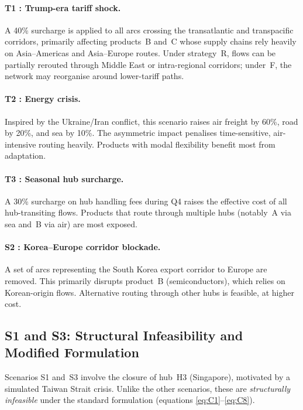 \paragraph{T1 : Trump-era tariff shock.}
A 40\% surcharge is applied to all arcs crossing the transatlantic and
transpacific corridors, primarily affecting products~B and~C whose supply
chains rely heavily on Asia--Americas and Asia--Europe routes.
Under strategy~R, flows can be partially rerouted through Middle East or
intra-regional corridors; under~F, the network may reorganise around
lower-tariff paths.

\paragraph{T2 : Energy crisis.}
Inspired by the Ukraine/Iran conflict, this scenario raises air freight by
60\%, road by 20\%, and sea by 10\%. The asymmetric impact penalises
time-sensitive, air-intensive routing heavily. Products with modal
flexibility benefit most from adaptation.

\paragraph{T3 : Seasonal hub surcharge.}
A 30\% surcharge on hub handling fees during Q4 raises the effective cost
of all hub-transiting flows. Products that route through multiple hubs
(notably~A via sea and~B via air) are most exposed.

\paragraph{S2 : Korea--Europe corridor blockade.}
A set of arcs representing the South Korea export corridor to Europe are
removed. This primarily disrupts product~B (semiconductors), which relies
on Korean-origin flows. Alternative routing through other hubs is feasible,
at higher cost.

\subsection{S1 and S3: Structural Infeasibility and Modified Formulation}
\label{sec:s1s3}

Scenarios S1 and~S3 involve the closure of hub~H3 (Singapore), motivated
by a simulated Taiwan Strait crisis. Unlike the other scenarios, these
are \emph{structurally infeasible} under the standard formulation
(equations \ref{eq:C1}--\ref{eq:C8}).

